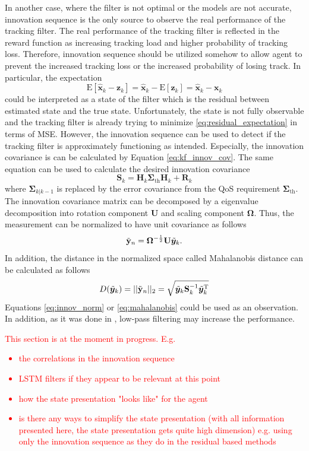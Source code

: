 \documentclass[english, 12pt, a4paper, elec, utf8, a-1b, online]{aaltothesis}
\newcommand{\E}[1]{\mathrm{E}\left[ #1 \right]}
\newcommand{\priorecov}{\boldsymbol{\Sigma}_{k|k-1}}
\newcommand{\prefitinnov}{\Tilde{\bm{y}}_k}
\renewcommand{\vec}[1]{\mathbf{#1}}
\newcommand{\x}{\bm{x}_k}
\newcommand{\xest}{\hat{\vec{x}}_k}
\newcommand{\z}{\bm{z}_k}
\newcommand{\omodel}{\vec{H}_k}
\newcommand{\ocov}{\vec{R}_k}
\newcommand{\innocov}{\vec{S}_k}
\newcommand{\transpose}[1]{#1^\text{T}}
\newcommand{\priorecovth}{\bm{\Sigma}_{\text{th}}}
\begin{document}
In another case, where the filter is not optimal or the models are not accurate, innovation sequence is the only source to observe the real performance of the tracking filter.
The real performance of the tracking filter is reflected in the reward function as increasing tracking load and higher probability of tracking loss.
Therefore, innovation sequence should be utilized somehow to allow agent to prevent the increased tracking loss or the increased probability of losing track.
In particular, the expectation
\begin{equation} \label{eq:residual_expectation}
    \E{\xest - \z} = \xest - \E{\z} = \xest - \x
\end{equation}
could be interpreted as a state of the filter which is the residual between estimated state and the true state.
Unfortunately, the state is not fully observable and the tracking filter is already trying to minimize \eqref{eq:residual_expectation} in terms of MSE.
However, the innovation sequence can be used to detect if the tracking filter is approximately functioning as intended.
Especially, the innovation covariance is can be calculated by Equation \eqref{eq:kf_innov_cov}.
The same equation can be used to calculate the desired innovation covariance
\begin{equation}
    \innocov = \omodel \priorecovth \omodel + \ocov
\end{equation}
where $\priorecov$ is replaced by the error covariance from the QoS requirement $\priorecovth$.
The innovation covariance matrix can be decomposed by a eigenvalue decomposition into rotation component $\vec{U}$ and scaling component $\bm{\Omega}$.   
Thus, the measurement can be normalized to have unit covariance as follows 
\begin{equation}\label{eq:innov_norm}
    \tilde{\vec{y}}_n = \bm{\Omega}^{-\frac{1}{2}} \vec{U}\prefitinnov.
\end{equation}
In addition, the distance in the normalized space called Mahalanobis distance can be calculated as follows
\begin{equation}\label{eq:mahalanobis}
    D(\prefitinnov) = || \tilde{\vec{y}}_n ||_2 = \sqrt{\prefitinnov \innocov^{-1} \transpose{\prefitinnov}}
\end{equation}
Equations \eqref{eq:innov_norm} or \eqref{eq:mahalanobis} could be used as an observation.
In addition, as it was done in \cite{Gardner1988}, low-pass filtering may increase the performance. 

\textcolor{red}{This section is at the moment in progress. E.g. 
\begin{itemize}
    \item the correlations in the innovation sequence
    \item LSTM filters if they appear to be relevant at this point
    \item how the state presentation "looks like" for the agent
    \item is there any ways to simplify the state presentation (with all information presented here, the state presentation gets quite high dimension) e.g. using only the innovation sequence as they do in the residual based methods
\end{itemize}
}
\end{document}

